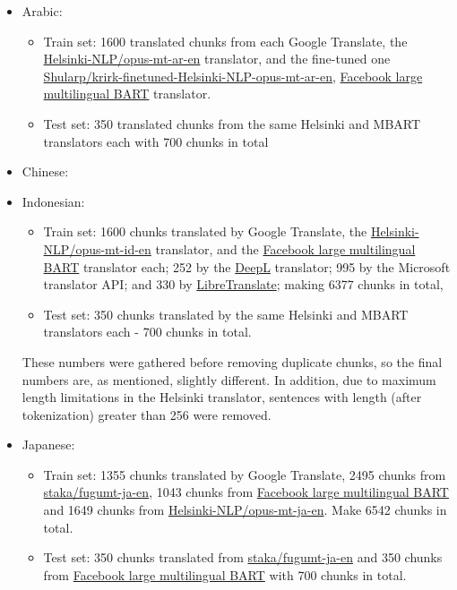 \documentclass[twocolumn]{article}
\begin{document}
\begin{itemize}
	\item Arabic:
	\begin{itemize}
            \item Train set: 1600 translated chunks from each Google Translate, the \href{https://huggingface.co/Helsinki-NLP/opus-mt-ar-en}{Helsinki-NLP/opus-mt-ar-en} translator, and the fine-tuned one \href{https://huggingface.co/Shularp/krirk-finetuned-Helsinki-NLP_opus-mt-ar-en}{Shularp/krirk-finetuned-Helsinki-NLP-opus-mt-ar-en}, \href{https://huggingface.co/facebook/mbart-large-50-many-to-one-mmt}{Facebook large multilingual BART} translator.
            \item Test set: 350 translated chunks from the same Helsinki and MBART translators each with 700 chunks in total
        \end{itemize}
	\item Chinese:
	\item Indonesian:
	\begin{itemize}
		\item Train set: 1600 chunks translated by Google Translate, the \href{https://huggingface.co/Helsinki-NLP/opus-mt-id-en}{Helsinki-NLP/opus-mt-id-en} translator, and the \href{https://huggingface.co/facebook/mbart-large-50-many-to-one-mmt}{Facebook large multilingual BART} translator each; 252 by the \href{https://www.deepl.com/en/translator}{DeepL} translator; 995  by the Microsoft translator API; and 330 by \href{https://libretranslate.com/}{LibreTranslate}; making 6377 chunks in total,
		\item Test set: 350 chunks translated by the same Helsinki and MBART translators each - 700 chunks in total.
	\end{itemize}
	These numbers were gathered before removing duplicate chunks, so the final numbers are, as mentioned, slightly different. In addition, due to maximum length limitations in the Helsinki translator, sentences with length (after tokenization) greater than 256 were removed.

	\item Japanese:
	\begin{itemize}
            \item Train set: 1355 chunks translated by Google Translate, 2495 chunks from \href{https://huggingface.co/staka/fugumt-ja-en}{staka/fugumt-ja-en}, 1043 chunks from \href{https://huggingface.co/facebook/mbart-large-50-many-to-one-mmt}{Facebook large multilingual BART} and 1649 chunks from \href{https://huggingface.co/Helsinki-NLP/opus-mt-ja-en}{Helsinki-NLP/opus-mt-ja-en}. Make 6542 chunks in total.
            \item Test set: 350 chunks translated from \href{https://huggingface.co/staka/fugumt-ja-en}{staka/fugumt-ja-en} and 350 chunks from \href{https://huggingface.co/facebook/mbart-large-50-many-to-one-mmt}{Facebook large multilingual BART} with 700 chunks in total.
        \end{itemize}
\end{itemize}
\end{document}
